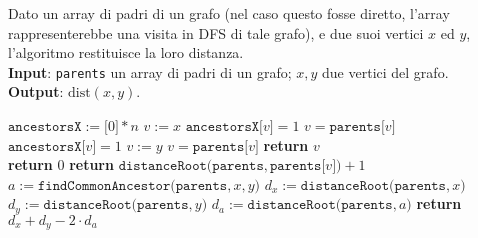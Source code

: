 \documentclass[a4paper, 12pt]{report}
\begin{document}
    \begin{algorithm}[H]
        \caption{
            Dato un array di padri di un grafo (nel caso questo fosse diretto, l'array rappresenterebbe una visita in DFS di tale grafo), e due suoi vertici $x$ ed $y$, l'algoritmo restituisce la loro distanza.\\
            \textbf{Input}: \texttt{parents} un array di padri di un grafo; $x, y$ due vertici del grafo.\\
            \textbf{Output}: $\mathrm{dist}(x, y)$.
        }

        \begin{algorithmic}[1]
                \State $\texttt{ancestorsX} := \texttt{[}0\texttt{]} * n$
                \State $v := x$
                    \State $\texttt{ancestorsX[}v\texttt{]} = 1$
                    \State $v = \texttt{parents[}v\texttt{]}$
                \EndWhile
                \State $\texttt{ancestorsX[}v\texttt{]} = 1$
                \State $v := y$
                    \State $v = \texttt{parents[}v\texttt{]}$
                \EndWhile
                \State \textbf{return} $v$
            \EndFunction
            \\
                    \State \textbf{return} $0$
                \Else
                \State \textbf{return} $\texttt{distanceRoot(parents}, \texttt{parents[}v\texttt{])} + 1$
                \EndIf
            \EndFunction
            \\
                \State $a := \texttt{findCommonAncestor(parents}, x, y\texttt{)}$
                \State $d_x := \texttt{distanceRoot(parents}, x\texttt{)}$
                \State $d_y := \texttt{distanceRoot(parents}, y\texttt{)}$
                \State $d_a := \texttt{distanceRoot(parents}, a\texttt{)}$
                \State \textbf{return} $d_x + d_y - 2 \cdot d_a$
            \EndFunction
        \end{algorithmic}
    \end{algorithm}
\end{document}
